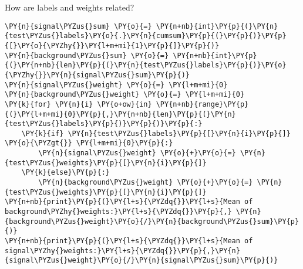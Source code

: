     How are labels and weights related?


{\par%
\vspace{-1\baselineskip}%
}%
\begin{notebookcell}[]%
\begin{addmargin}[\cellleftmargin]{0em}%
{\smaller%
\par%
%
\vspace{-1\smallerfontscale}%
\begin{Verbatim}[commandchars=\\\{\}]
\PY{n}{signal\PYZus{}sum} \PY{o}{=} \PY{n+nb}{int}\PY{p}{(}\PY{n}{test\PYZus{}labels}\PY{o}{.}\PY{n}{cumsum}\PY{p}{(}\PY{p}{)}\PY{p}{[}\PY{o}{\PYZhy{}}\PY{l+m+mi}{1}\PY{p}{]}\PY{p}{)}
\PY{n}{background\PYZus{}sum} \PY{o}{=} \PY{n+nb}{int}\PY{p}{(}\PY{n+nb}{len}\PY{p}{(}\PY{n}{test\PYZus{}labels}\PY{p}{)}\PY{o}{\PYZhy{}}\PY{n}{signal\PYZus{}sum}\PY{p}{)}
\PY{n}{signal\PYZus{}weight} \PY{o}{=} \PY{l+m+mi}{0}
\PY{n}{background\PYZus{}weight} \PY{o}{=} \PY{l+m+mi}{0}
\PY{k}{for} \PY{n}{i} \PY{o+ow}{in} \PY{n+nb}{range}\PY{p}{(}\PY{l+m+mi}{0}\PY{p}{,}\PY{n+nb}{len}\PY{p}{(}\PY{n}{test\PYZus{}labels}\PY{p}{)}\PY{p}{)}\PY{p}{:}
    \PY{k}{if} \PY{n}{test\PYZus{}labels}\PY{p}{[}\PY{n}{i}\PY{p}{]} \PY{o}{\PYZgt{}} \PY{l+m+mi}{0}\PY{p}{:}
        \PY{n}{signal\PYZus{}weight} \PY{o}{+}\PY{o}{=} \PY{n}{test\PYZus{}weights}\PY{p}{[}\PY{n}{i}\PY{p}{]}
    \PY{k}{else}\PY{p}{:}
        \PY{n}{background\PYZus{}weight} \PY{o}{+}\PY{o}{=} \PY{n}{test\PYZus{}weights}\PY{p}{[}\PY{n}{i}\PY{p}{]}
\PY{n+nb}{print}\PY{p}{(}\PY{l+s}{\PYZdq{}}\PY{l+s}{Mean of background\PYZhy{}weights:}\PY{l+s}{\PYZdq{}}\PY{p}{,} \PY{n}{background\PYZus{}weight}\PY{o}{/}\PY{n}{background\PYZus{}sum}\PY{p}{)}
\PY{n+nb}{print}\PY{p}{(}\PY{l+s}{\PYZdq{}}\PY{l+s}{Mean of signal\PYZhy{}weights:}\PY{l+s}{\PYZdq{}}\PY{p}{,}\PY{n}{signal\PYZus{}weight}\PY{o}{/}\PY{n}{signal\PYZus{}sum}\PY{p}{)}
\end{Verbatim}
%
\par%
\vspace{-1\smallerfontscale}}%
\end{addmargin}
\end{notebookcell}


